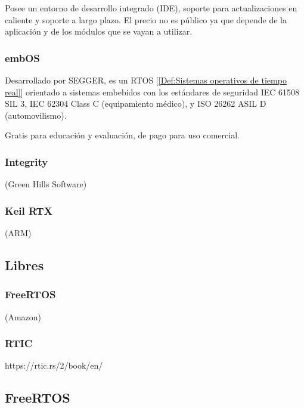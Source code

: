 Posee un entorno de desarrollo integrado (IDE), soporte para actualizaciones en caliente y soporte a largo plazo. El precio no es público ya que depende de la aplicación y de los módulos que se vayan a utilizar.

\subsubsection{embOS}
Desarrollado por SEGGER, es un RTOS [\ref{Def:Sistemas operativos de tiempo real}] orientado a sistemas embebidos con los estándares de seguridad IEC 61508 SIL 3, IEC 62304 Class C (equipamiento médico), y ISO 26262 ASIL D (automovilismo).

Gratis para educación y evaluación, de pago para uso comercial.
\subsubsection{Integrity}
(Green Hills Software)
\subsubsection{Keil RTX}
(ARM)

\subsection{Libres}
\subsubsection{FreeRTOS}
(Amazon)
\subsubsection{RTIC}
https://rtic.rs/2/book/en/
\subsection{FreeRTOS}



